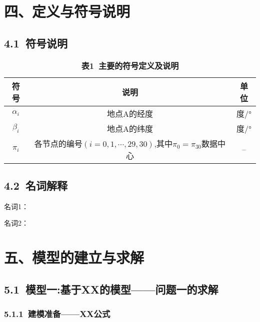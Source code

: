 \documentclass[12pt,a4paper]{article}
\begin{document}
\section*{四、定义与符号说明}
\subsection*{4.1\ 符号说明}
\vspace{-0.5em}
\begin{table}[htbp!]
	\centering
        \caption*{\textbf{表1\ 主要的符号定义及说明}} 
	\begin{tabular}[t]{ccc}
		\toprule
                \textbf{符号} & \textbf{说明}  & \textbf{单位}\\
		\midrule
		$\alpha_{i}$ & 地点A的经度 & 度/° \\
		$\beta_{i}$ & 地点A的纬度 & 度/° \\
		$\pi_{i}$ & 各节点的编号$(i=0,1,\cdots,29,30)$,其中$\pi_{0}=\pi_{30}$数据中心 & -- \\
		\bottomrule
	\end{tabular}
\end{table}\vspace{-1.0em}
\subsection*{4.2\ 名词解释}
\begin{spacing}{1.2}
	名词1：
\end{spacing}
\begin{spacing}{1.2}
	名词2：
\end{spacing}
\vspace{-0.5em}
\section*{五、模型的建立与求解}
\subsection*{5.1\ 模型一:基于XX的模型——问题一的求解}
\subsubsection*{5.1.1\ 建模准备——XX公式}
\end{document}
